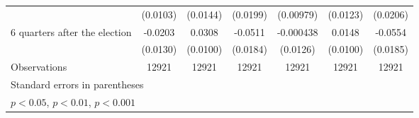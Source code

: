 \begin{table}[!ht]
\begin{tabular}{l*{6}{c}}
                    &    (0.0103)         &    (0.0144)         &    (0.0199)         &   (0.00979)         &    (0.0123)         &    (0.0206)         \\
[1em]
 6 quarters after the election&     -0.0203         &      0.0308\sym{**} &     -0.0511\sym{**} &   -0.000438         &      0.0148         &     -0.0554\sym{**} \\
                    &    (0.0130)         &    (0.0100)         &    (0.0184)         &    (0.0126)         &    (0.0100)         &    (0.0185)         \\
\hline
Observations        &       12921         &       12921         &       12921         &       12921         &       12921         &       12921         \\
\hline\hline
\multicolumn{7}{l}{\footnotesize Standard errors in parentheses}\\
\multicolumn{7}{l}{\footnotesize \sym{*} \(p<0.05\), \sym{**} \(p<0.01\), \sym{***} \(p<0.001\)}\\
\end{tabular}
\end{table}
